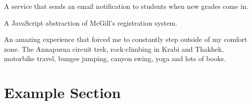 \documentclass[letterpaper]{deedy-resume} %
\begin{document}

A service that sends an email notification to students when new grades
come in.
\sectionspace


A JavaScript abstraction of McGill's registration system.

\sectionspace


An amazing experience that forced me to constantly step outside of my
comfort zone.
The Annapurna circuit trek, rock-climbing in Krabi and Thakhek,
motorbike travel, bungee jumping, canyon swing, yoga and lots
of books.

\sectionspace %

%
%
%
%


\newpage %


\section{Example Section}




\end{document}
